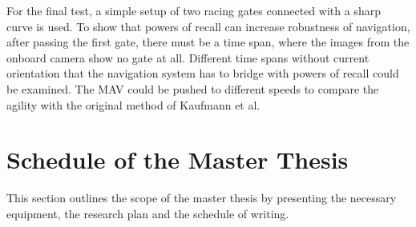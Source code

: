 For the final test, a simple setup of two racing gates connected with a sharp curve is used.
To show that powers of recall can increase robustness of navigation,
after passing the first gate, there must be a time span, where the images from the onboard camera show no gate at all.
Different time spans without current orientation that the navigation system has to bridge with powers of recall could be examined.
The MAV could be pushed to different speeds to compare the agility with the original method of Kaufmann et al. \cite{Kaufmann2018}
































\section{Schedule of the Master Thesis}

This section outlines the scope of the master thesis by presenting the necessary equipment,
the research plan and the schedule of writing.


